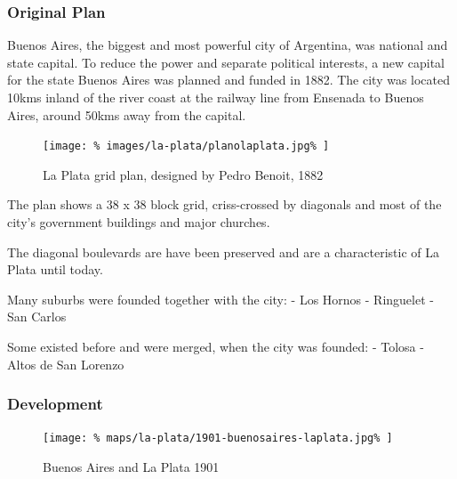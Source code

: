 \documentclass[twocolumn]{article}
\begin{document}
			
			\subsubsection{Original Plan}
			Buenos Aires, the biggest and most powerful city of Argentina, was national and state capital. To reduce the power and separate political interests, a new capital for the state Buenos Aires was planned and funded in 1882.
			The city was located 10kms inland of the river coast at the railway line from Ensenada to Buenos Aires, around 50kms away from the capital.
			
			\begin{figure}[H]
				\texttt{[image: \%
					images/la-plata/planolaplata.jpg\%
				]}
				\caption{La Plata grid plan, designed by Pedro Benoit, 1882\cite{RecoletaCemetery:PedroBenoit}}
				\label{fig:img:plan-la-plata-1882}
			\end{figure}
			
			The plan shows a 38 x 38 block grid, criss-crossed by diagonals and most of the city’s government buildings and major churches.
			
			The diagonal boulevards are have been preserved and are a characteristic of La Plata until today.
			
			Many suburbs were founded together with the city:
			- Los Hornos
			- Ringuelet
			- San Carlos
			
			
			Some existed before and were merged, when the city was founded:
			- Tolosa
			- Altos de San Lorenzo
			
			
			
			\subsubsection{Development}
			
			
			\begin{figure}[H]
				\texttt{[image: \%
					maps/la-plata/1901-buenosaires-laplata.jpg\%
				]}
				\caption{Buenos Aires and La Plata 1901\cite{RiviereDeLaPlata}}
				\label{fig:map:buenosaires-la-plata-1901}
			\end{figure}
			
			
			
\end{document}
